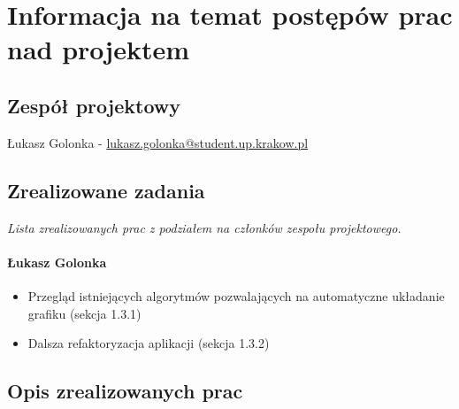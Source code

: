 \documentclass[12pt,a4paper,oneside]{article}
\theoremstyle{definition}
\numberwithin{equation}{section}
\begin{document}
\tableofcontents


\newpage

\section{Informacja na temat postępów prac nad projektem}
\subsection{Zespół projektowy}
Łukasz Golonka - \href{mailto:lukasz.golonka@student.up.krakow.pl}{lukasz.golonka@student.up.krakow.pl}
\subsection{Zrealizowane zadania}
\textit{Lista zrealizowanych prac z podziałem na członków zespołu projektowego.}
\paragraph{Łukasz Golonka}
\begin{itemize}
\item Przegląd istniejących algorytmów pozwalających na automatyczne układanie grafiku (sekcja 1.3.1)
\item Dalsza refaktoryzacja aplikacji (sekcja 1.3.2)
\end{itemize}
\subsection {Opis zrealizowanych prac}
\end{document}
